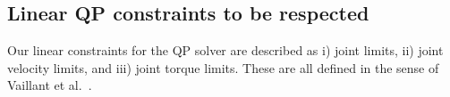 \documentclass[conference]{IEEEtran}
\begin{document}
\subsection{Linear QP constraints to be respected}
\label{QP constraints}
\noindent
Our linear constraints for the QP solver are described as i) joint limits, ii) joint velocity limits, and iii) joint torque limits.
These are all defined in the sense of Vaillant et al.~\cite{vaillantMulticontactVerticalLadder2016}.
\end{document}
